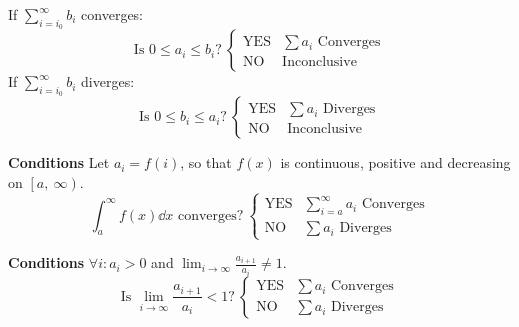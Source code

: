 \documentclass{article}
\theoremstyle{plain}
\numberwithin{theorem}{subsection}
\theoremstyle{definition}
\numberwithin{definition}{subsection}
\theoremstyle{remark}
\numberwithin{note}{subsection}
\begin{document}
\begin{multicols}{2}
\begin{mdframed}[style=exampledefaultcols,frametitle={Comparison Test}]
        \noindent If $\displaystyle \sum_{i=i_0}^\infty b_i$ converges:
        \begin{equation*}
            \text{Is $0\leqslant a_i \leqslant b_i$?}\:
            \begin{cases}
                \text{YES} & \text{$\sum a_i$ Converges} \\
                \text{NO}  & \text{Inconclusive}
            \end{cases}
        \end{equation*}
        If $\displaystyle \sum_{i=i_0}^\infty b_i$ diverges:
        \begin{equation*}
            \text{Is $0\leqslant b_i \leqslant a_i$?}\:
            \begin{cases}
                \text{YES} & \text{$\sum a_i$ Diverges} \\
                \text{NO}  & \text{Inconclusive}
            \end{cases}
        \end{equation*}
    \end{mdframed}
    \begin{mdframed}[style=exampledefaultcols,frametitle={Integral Test}]
        \textbf{Conditions} Let $a_i=f(i)$, so that $f(x)$ is continuous, positive and decreasing on $\left[a,\:\infty\right)$.
        \begin{equation*}
            \text{$\int_a^\infty f(x) \dd{x}$ converges?}\:
            \begin{cases}
                \text{YES} & \text{$\sum_{i=a}^\infty a_i$ Converges} \\
                \text{NO}  & \text{$\sum a_i$ Diverges}
            \end{cases}
        \end{equation*}
    \end{mdframed}
    \begin{mdframed}[style=exampledefaultcols,frametitle={Ratio Test}]
        \textbf{Conditions} $\forall i:a_i>0$ and $\displaystyle \lim_{i\to\infty}\frac{a_{i+1}}{a_i}\neq 1$.
        \begin{equation*}
            \text{Is $\lim_{i\to\infty}\frac{a_{i+1}}{a_i} < 1$?}\:
            \begin{cases}
                \text{YES} & \text{$\sum a_i$ Converges} \\
                \text{NO}  & \text{$\sum a_i$ Diverges}
            \end{cases}
        \end{equation*}

\end{mdframed}
\end{multicols}
\end{document}
